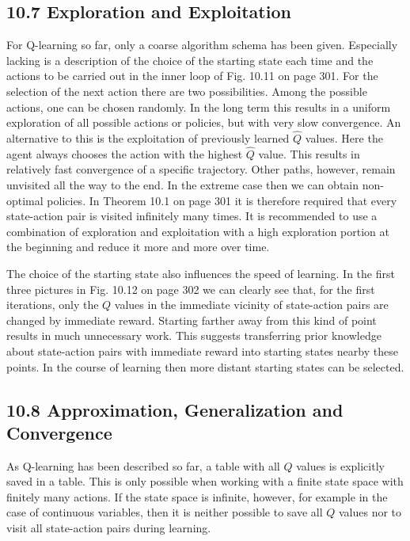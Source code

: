 \documentclass[10pt]{book}
\begin{document}
\begin{center}
\begin{enumerate}
\begin{center}
\begin{center}
\begin{center}
\begin{center}
\begin{center}
\subsection*{10.7 Exploration and Exploitation}
For Q-learning so far, only a coarse algorithm schema has been given. Especially lacking is a description of the choice of the starting state each time and the actions to be carried out in the inner loop of Fig. 10.11 on page 301. For the selection of the next action there are two possibilities. Among the possible actions, one can be chosen randomly. In the long term this results in a uniform exploration of all possible actions or policies, but with very slow convergence. An alternative to this is the exploitation of previously learned $\hat{Q}$ values. Here the agent always chooses the action with the highest $\hat{Q}$ value. This results in relatively fast convergence of a specific trajectory. Other paths, however, remain unvisited all the way to the end. In the extreme case then we can obtain non-optimal policies. In Theorem 10.1 on page 301 it is therefore required that every state-action pair is visited infinitely many times. It is recommended to use a combination of exploration and exploitation with a high exploration portion at the beginning and reduce it more and more over time.

The choice of the starting state also influences the speed of learning. In the first three pictures in Fig. 10.12 on page 302 we can clearly see that, for the first iterations, only the $Q$ values in the immediate vicinity of state-action pairs are changed by immediate reward. Starting farther away from this kind of point results in much unnecessary work. This suggests transferring prior knowledge about state-action pairs with immediate reward into starting states nearby these points. In the course of learning then more distant starting states can be selected.

\subsection*{10.8 Approximation, Generalization and Convergence}
As Q-learning has been described so far, a table with all $Q$ values is explicitly saved in a table. This is only possible when working with a finite state space with finitely many actions. If the state space is infinite, however, for example in the case of continuous variables, then it is neither possible to save all $Q$ values nor to visit all state-action pairs during learning.



\end{center}
\end{center}
\end{center}
\end{center}
\end{center}
\end{enumerate}
\end{center}
\end{document}
